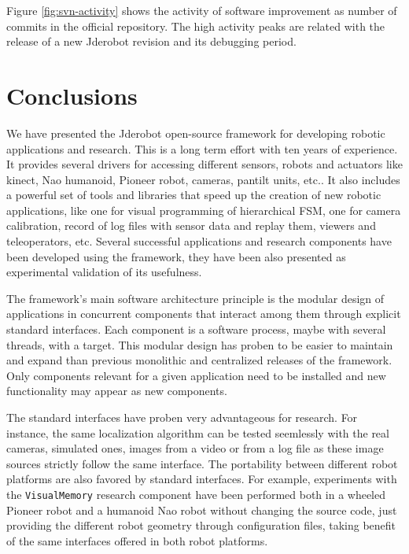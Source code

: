 \documentclass[twocolumn]{svjour3}          %
\begin{document}
Figure \ref{fig:svn-activity} shows the activity of software improvement as number of commits in the official repository. The high activity peaks are related with the release of a new Jderobot revision and its debugging period.

\section{Conclusions}

We have presented the Jderobot open-source framework for developing robotic applications and research. This is a long term effort with ten years of experience. It provides several drivers for accessing different sensors, robots and actuators like kinect, Nao humanoid, Pioneer robot, cameras, pantilt units, etc.. It also includes a powerful set of tools and libraries that speed up the creation of new robotic applications, like one for visual programming of hierarchical FSM, one for camera calibration, record of log files with sensor data and replay them, viewers and teleoperators, etc. Several successful applications and research components have been developed using the framework, they have been also presented as experimental validation of its usefulness.

The framework's main software architecture principle is the modular design of applications in concurrent components that interact among them through explicit standard interfaces. Each component is a software process, maybe with several threads, with a target. This modular design has proben to be easier to maintain and expand than previous monolithic and centralized releases of the framework. Only components relevant for a given application need to be installed and new functionality may appear as new components.

The standard interfaces have proben very advantageous for research. For instance, the same localization algorithm can be tested seemlessly with the real cameras, simulated ones, images from a video or from a log file as these image sources strictly follow the same interface. The portability between different robot platforms are also favored by standard interfaces. For example, experiments with the \texttt{VisualMemory} research component have been performed both in a wheeled Pioneer robot and a humanoid Nao robot without changing the source code, just providing the different robot geometry through configuration files, taking benefit of the same interfaces offered in both robot platforms.
\end{document}

